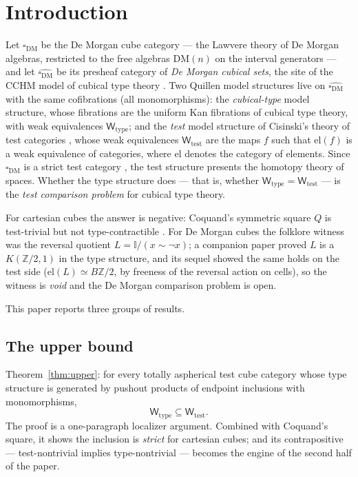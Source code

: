 \documentclass[11pt]{amsart}
\theoremstyle{definition}
\newcommand{\I}{\mathbb{I}}
\newcommand{\cube}{\square_{\mathrm{DM}}}
\newcommand{\el}{\mathrm{el}}
\newcommand{\DM}{\mathrm{DM}}
\newcommand{\Wtest}{\mathsf{W}_{\mathrm{test}}}
\newcommand{\Wtype}{\mathsf{W}_{\mathrm{type}}}
\begin{document}
\section{Introduction}
\label{sec:intro}

Let $\cube$ be the De Morgan cube category --- the Lawvere theory of
De Morgan algebras, restricted to the free algebras
$\DM(n)$ on the interval generators --- and let
$\widehat{\cube}$ be its presheaf category of \emph{De Morgan
  cubical sets}, the site of the CCHM model of cubical type
theory \cite{CCHM}.  Two Quillen model structures live on
$\widehat{\cube}$ with the same cofibrations (all monomorphisms):
the \emph{cubical-type} model structure, whose fibrations are the
uniform Kan fibrations of cubical type theory, with weak
equivalences $\Wtype$; and the \emph{test} model structure of
Cisinski's theory of test categories \cite{Cisinski}, whose weak
equivalences $\Wtest$ are the maps $f$ such that $\el(f)$ is a weak
equivalence of categories, where $\el$ denotes the category of
elements.  Since $\cube$ is a strict test category
\cite{BuchholtzMorehouse, Maltsiniotis}, the test structure
presents the homotopy theory of spaces.  Whether the type structure
does --- that is, whether $\Wtype = \Wtest$ --- is the
\emph{test comparison problem} for cubical type theory.

For cartesian cubes the answer is negative: Coquand's symmetric
square $Q$ is test-trivial but not type-contractible
\cite{CoqNote, ACCRS}.  For De Morgan cubes the folklore witness
was the reversal quotient $L = \I/(x \sim \neg x)$; a companion
paper \cite{PaperK} proved $L$ is a $K(\mathbb{Z}/2,1)$ in the type
structure, and its sequel \cite{PaperL} showed the same holds on
the test side ($\el(L) \simeq B\mathbb{Z}/2$, by freeness of the
reversal action on cells), so the witness is \emph{void} and the
De Morgan comparison problem is open.

This paper reports three groups of results.

\subsection*{The upper bound}
Theorem~\ref{thm:upper}: for every totally aspherical test cube
category whose type structure is generated by
pushout products of endpoint inclusions with monomorphisms,
\[
  \Wtype \subseteq \Wtest .
\]
The proof is a one-paragraph localizer argument.  Combined with
Coquand's square, it shows the inclusion is \emph{strict} for
cartesian cubes; and its contrapositive --- test-nontrivial implies
type-nontrivial --- becomes the engine of the second half of the
paper.
\end{document}
